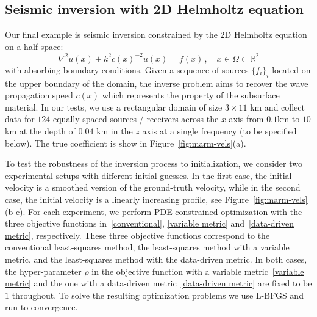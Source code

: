 \documentclass[12pt]{amsart}
\begin{document}
\subsection{Seismic inversion with 2D Helmholtz equation}

Our final example is seismic inversion constrained by the 2D Helmholtz equation on a half-space:
\[
\nabla^2 u(x) + k^2 c(x)^{-2} u(x) = f(x)\,,\quad x\in \Omega \subset \mathbb{R}^2
\]
with absorbing boundary conditions. Given a sequence of sources $\{f_i\}_i$ located on the upper boundary of the domain, the inverse problem aims to recover the wave propagation speed $c(x)$ which represents the property of the subsurface material. In our tests, we use a rectangular domain of size $3 \times 11$ km and collect data for $124$ equally spaced sources / receivers across the $x$-axis from $0.1$km to $10$km at the depth of $0.04$ km in the $z$ axis at a single frequency (to be specified below). The true coefficient is show in Figure~\ref{fig:marm-vels}(a).

To test the robustness of the inversion process to initialization, we consider two experimental setups with different initial guesses. In the first case, the initial velocity is a smoothed version of the ground-truth velocity, while in the second case, the initial velocity is a linearly increasing profile,  see Figure~\ref{fig:marm-vels} (b-c). For each experiment, we perform PDE-constrained optimization with the three objective functions in~\eqref{conventional}, \eqref{variable metric} and~\eqref{data-driven metric}, respectively. These three objective functions correspond to the conventional least-squares method,  the least-squares method with a variable metric, and the least-squares method with the data-driven metric. In both cases, the hyper-parameter $\rho$ in the objective function with a variable metric~\eqref{variable metric} and the one with a data-driven metric~\eqref{data-driven metric} are fixed to be $1$ throughout. To solve the resulting optimization problems we use L-BFGS and run to convergence.
\end{document}
